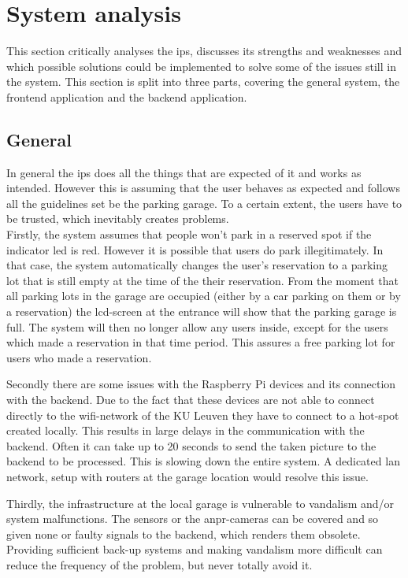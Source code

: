 \section{System analysis}\label{sec:system analysis}
This section critically analyses the \ac{ips}, discusses its strengths and weaknesses and which possible solutions could be implemented to solve some of the issues still in the system. This section is split into three parts, covering the general system, the frontend application and the  backend application.

\subsection{General}
In general the \ac{ips} does all the things that are expected of it and works as intended. However this is assuming that the user behaves as expected and follows all the guidelines set be the parking garage. To a certain extent, the users have to be trusted, which inevitably creates problems. \\

\ind Firstly, the system assumes that people won't park in a reserved spot if the indicator \ac{led} is red. However it is possible that users do park illegitimately. In that case, the system automatically changes the user's reservation to a parking lot that is still empty at the time of the their reservation. From the moment that all parking lots in the garage are occupied (either by a car parking on them or by a reservation) the \ac{lcd}-screen at the entrance will show that the parking garage is full. The system will then no longer allow any users inside, except for the users which made a reservation in that time period. This assures a free parking lot for users who made a reservation.

\ind Secondly there are some issues with the Raspberry Pi devices and its connection with the backend. Due to the fact that these devices are not able to connect directly to the \ac{wifi}-network of the KU Leuven they have to connect to a hot-spot created locally. This results in large delays in the communication with the backend. Often it can take up to 20 seconds to send the taken picture to the backend to be processed. This is slowing down the entire system. A dedicated \ac{lan} network, setup with routers at the garage location would resolve this issue.

\ind Thirdly, the infrastructure at the local garage is vulnerable to vandalism and/or system malfunctions. The sensors or the \ac{anpr}-cameras can be covered and so given none or faulty signals to the backend, which renders them obsolete. Providing sufficient back-up systems and making vandalism more difficult can reduce the frequency of the problem, but never totally avoid it.

